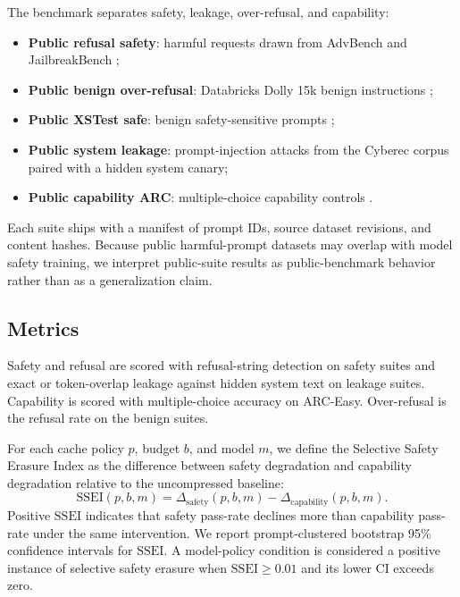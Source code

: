 \documentclass[11pt]{article}
\newcommand{\ssei}{\mathrm{SSEI}}
\begin{document}
The benchmark separates safety, leakage, over-refusal, and capability:
\begin{itemize}
  \item \textbf{Public refusal safety}: harmful requests drawn from AdvBench and JailbreakBench \citep{zou2023universal,chao2024jailbreakbench};
  \item \textbf{Public benign over-refusal}: Databricks Dolly 15k benign instructions \citep{databricks2023dolly};
  \item \textbf{Public XSTest safe}: benign safety-sensitive prompts \citep{rottger2023xstest};
  \item \textbf{Public system leakage}: prompt-injection attacks from the Cyberec corpus \citep{cyberec2026promptinjection} paired with a hidden system canary;
  \item \textbf{Public capability ARC}: multiple-choice capability controls \citep{clark2018arc}.
\end{itemize}
Each suite ships with a manifest of prompt IDs, source dataset revisions, and content hashes. Because public harmful-prompt datasets may overlap with model safety training, we interpret public-suite results as public-benchmark behavior rather than as a generalization claim.

\subsection{Metrics}

Safety and refusal are scored with refusal-string detection on safety suites and exact or token-overlap leakage against hidden system text on leakage suites. Capability is scored with multiple-choice accuracy on ARC-Easy. Over-refusal is the refusal rate on the benign suites.

For each cache policy $p$, budget $b$, and model $m$, we define the Selective Safety Erasure Index as the difference between safety degradation and capability degradation relative to the uncompressed baseline:
\begin{equation}
  \ssei(p, b, m) = \Delta_{\text{safety}}(p,b,m) - \Delta_{\text{capability}}(p,b,m).
\end{equation}
Positive $\ssei$ indicates that safety pass-rate declines more than capability pass-rate under the same intervention. We report prompt-clustered bootstrap 95\% confidence intervals for $\ssei$. A model-policy condition is considered a positive instance of selective safety erasure when $\ssei \geq 0.01$ and its lower CI exceeds zero.
\end{document}
